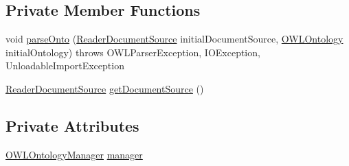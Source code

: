 \subsection*{Private Member Functions}
\begin{DoxyCompactItemize}
\item 
void \hyperlink{classorg_1_1semanticweb_1_1owlapi_1_1api_1_1test_1_1syntax_1_1rdfxml_1_1_multiple_ontology_loads_test_a4c47000f6a593a5e03cb42d11c2d3b94}{parse\-Onto} (\hyperlink{classorg_1_1semanticweb_1_1owlapi_1_1io_1_1_reader_document_source}{Reader\-Document\-Source} initial\-Document\-Source, \hyperlink{interfaceorg_1_1semanticweb_1_1owlapi_1_1model_1_1_o_w_l_ontology}{O\-W\-L\-Ontology} initial\-Ontology)  throws O\-W\-L\-Parser\-Exception, I\-O\-Exception,             Unloadable\-Import\-Exception 
\item 
\hyperlink{classorg_1_1semanticweb_1_1owlapi_1_1io_1_1_reader_document_source}{Reader\-Document\-Source} \hyperlink{classorg_1_1semanticweb_1_1owlapi_1_1api_1_1test_1_1syntax_1_1rdfxml_1_1_multiple_ontology_loads_test_a2ba2afcb584d400652ebc8eb5f8aec73}{get\-Document\-Source} ()
\end{DoxyCompactItemize}
\subsection*{Private Attributes}
\begin{DoxyCompactItemize}
\item 
\hyperlink{interfaceorg_1_1semanticweb_1_1owlapi_1_1model_1_1_o_w_l_ontology_manager}{O\-W\-L\-Ontology\-Manager} \hyperlink{classorg_1_1semanticweb_1_1owlapi_1_1api_1_1test_1_1syntax_1_1rdfxml_1_1_multiple_ontology_loads_test_ae61a16527a997a49644c6532ee26359c}{manager}
\end{DoxyCompactItemize}
